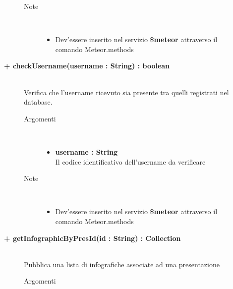 \begin{description}
\begin{description}
\begin{description}
\begin{itemize}
				\end{itemize}
			\item[Note] \hfill \\
			\begin{itemize}
					\item Dev'essere inserito nel servizio \textbf{\$meteor} attraverso il comando Meteor.methods
				\end{itemize}
		\end{description}
	\end{description}
	
	\begin{description}
		\item[\textbf{\color{blue}+ checkUsername(username : String) : boolean			}] \hfill \\
			Verifica che l'username ricevuto sia presente tra quelli registrati nel database.
			
		\begin{description}
			\item[Argomenti] \hfill \\
				\begin{itemize}
				
					\item \textbf{username : String			} \hfill \\
					Il codice identificativo dell'username da verificare
					
				\end{itemize}
			\item[Note] \hfill \\
			\begin{itemize}
					\item Dev'essere inserito nel servizio \textbf{\$meteor} attraverso il comando Meteor.methods
				\end{itemize}
		\end{description}
	\end{description}
	
	\begin{description}
		\item[\textbf{\color{blue}+ getInfographicByPresId(id : String) : Collection			}] \hfill \\
			Pubblica una lista di infografiche associate ad una presentazione
			
		\begin{description}
			\item[Argomenti] \hfill \\
				\begin{itemize}
				

\end{itemize}
\end{description}
\end{description}
\end{description}
